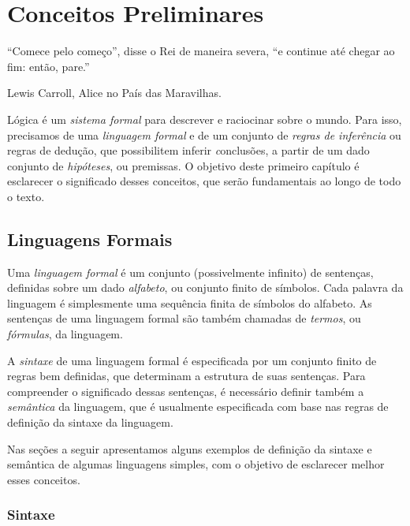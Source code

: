\chapter{Conceitos Preliminares}\label{cap1}

\epigraph{``Comece pelo começo'', disse o Rei de maneira severa, ``e continue até chegar ao fim: então, pare.''}{Lewis Carroll, Alice no País das Maravilhas.}

Lógica é um \emph{sistema formal\/} para descrever e raciocinar sobre o mundo. Para isso, precisamos de uma \emph{linguagem formal\/} e de um conjunto de \emph{regras de inferência\/} ou regras de dedução, que possibilitem inferir {\emph conclusões\/}, a partir de um dado conjunto de \emph{hipóteses\/}, ou premissas. O objetivo deste primeiro capítulo é esclarecer o significado desses conceitos, que serão fundamentais ao longo de todo o texto.

\section{Linguagens Formais}

Uma \emph{linguagem formal\/} \'e um conjunto (possivelmente infinito) de sentenças, definidas sobre um dado \emph{alfabeto\/}, ou conjunto finito de símbolos. Cada palavra da linguagem é simplesmente uma sequência finita de símbolos do alfabeto. As sentenças de uma linguagem formal são também chamadas de \emph{termos\/}, ou \emph{fórmulas}, da linguagem.

A \emph{sintaxe\/} de uma linguagem formal é especificada por um conjunto finito de regras bem definidas, que determinam a estrutura de suas sentenças. Para compreender o significado dessas sentenças, é necessário definir também a \emph{semântica\/} da linguagem, que é usualmente especificada com base nas regras de definição da sintaxe da linguagem.

Nas seções a seguir apresentamos alguns exemplos de definição da sintaxe e semântica de algumas linguagens simples, com o objetivo de esclarecer melhor esses conceitos.

\subsection{Sintaxe}\label{cap1:syn}

